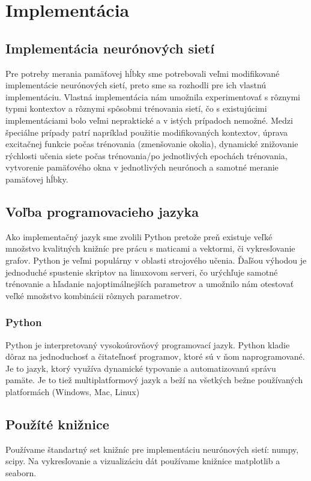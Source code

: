 \chapter{Implementácia}

\section{Implementácia neurónových sietí}
Pre potreby merania pamäťovej hĺbky sme potrebovali 
veľmi modifikované implementácie neurónových sietí, 
preto sme sa rozhodli pre ich vlastnú implementáciu. 
Vlastná implementácia nám umožnila experimentovať s rôznymi typmi kontextov a rôznymi spôsobmi 
trénovania sietí, čo s existujúcimi implementáciami bolo veľmi nepraktické a v istých prípadoch nemožné.
Medzi špeciálne prípady patrí napríklad použitie modifikovaných kontextov, 
úprava excitačnej funkcie počas trénovania (zmenšovanie okolia), dynamické znižovanie rýchlosti
učenia siete počas trénovania/po jednotlivých epochách trénovania, vytvorenie pamäťového okna v jednotlivých neurónoch 
a samotné meranie pamäťovej hĺbky.

\section{Voľba programovacieho jazyka}
Ako implementačný jazyk sme zvolili Python pretože preň existuje veľké množstvo kvalitných knižníc pre prácu
s maticami a vektormi, či vykresľovanie grafov.
Python je veľmi populárny v oblasti strojového učenia. 
Ďaľšou výhodou je jednoduché spustenie skriptov
na linuxovom serveri, čo urýchľuje samotné trénovanie a hľadanie najoptimálnejších parametrov a umožnilo nám otestovať 
veľké množstvo kombinácii rôznych parametrov.
\subsection{Python}

Python je interpretovaný vysokoúrovňový programovací jazyk. 
Python kladie dôraz na jednoduchosť a čitateľnosť programov, ktoré sú v ňom naprogramované.
Je to jazyk, ktorý využíva dynamické typovanie a automatizovanú správu pamäte. Je to tiež multiplatformový 
jazyk a beží na všetkých bežne používaných platformách (Windows, Mac, Linux)

\section{Použíté knižnice}
Používame štandartný set knižníc pre implementáciu neurónových sietí: numpy, scipy.
Na vykresľovanie a vizualizáciu dát používame knižnice matplotlib a seaborn.
